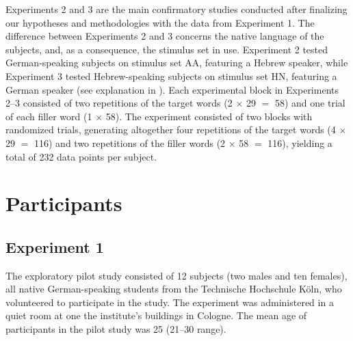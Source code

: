 Experiments 2 and 3 are the main confirmatory studies conducted after finalizing our hypotheses and methodologies with the data from Experiment 1. 
The difference between Experiments 2 and 3 concerns the native language of the subjects, and, as a consequence, the stimulus set in use. 
Experiment 2 tested German-speaking subjects on stimulus set AA, featuring a Hebrew speaker, while Experiment 3 tested Hebrew-speaking subjects on stimulus set HN, featuring a German speaker (see explanation in ). 
Each experimental block in Experiments 2–3 consisted of two repetitions of the target words (2 \(\times\) 29 \(=\) 58) and one trial of each filler word (1 \(\times\) 58). The experiment consisted of two blocks with randomized trials, generating altogether four repetitions of the target words (4 \(\times\) 29 \(=\) 116) and two repetitions of the filler words (2 \(\times\) 58 \(=\) 116), yielding a total of 232 data points per subject.


\section{Participants}\label{sec:participants}

\subsection{Experiment 1}\label{experiment-1}

The exploratory pilot study consisted of 12 subjects (two males and ten females), all native German-speaking students from the Technische Hochschule Köln, who volunteered to participate in the study. The experiment was administered in a quiet room at one the institute's buildings in Cologne. The mean age of participants in the pilot study was 25 (21--30 range).


